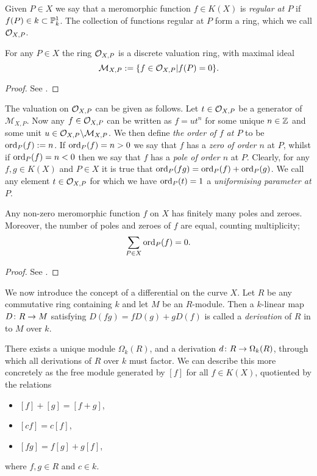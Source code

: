 Given $P \in X$ we say that a meromorphic function $f \in K(X)$ is \emph{regular at $P$} if $f(P) \in k \subset {\mathbb P}_k^1$.
The collection of functions regular at $P$ form a ring, which we call ${\cal O}_{X,P}$.

    \begin{lem}
    For any $P \in X$ the ring ${\cal O}_{X,P}$ is a discrete valuation ring, with maximal ideal
        \[
        \mathcal {M}_{X,P} := \{ f \in {\cal O}_{X,P} | f(P) = 0 \}.
        \]
    \end{lem}
    \begin{proof}
    See \cite[Chap.\ 1, \S 4]{fulton}.
    \end{proof}

The valuation on ${\cal O}_{X,P}$ can be given as follows.
Let $t \in {\cal O}_{X,P}$ be a generator of $\mathcal{M}_{X,P}$.
Now any $f \in {\cal O}_{X,P}$ can be written as $f = ut^n$ for some unique $n \in {\mathbb Z}$ and some unit $u \in {\cal O}_{X,P}\backslash \mathcal{M}_{X,P}$.
We then define \emph{the order of $f$ at $P$} to be $\operatorname{ord}_P(f) := n$.
If $\operatorname{ord}_P(f) = n >0$ we say that $f$ has a \emph{zero of order $n$} at $P$, whilst if $\operatorname{ord}_P(f) = n < 0$ then we say that $f$ has a \emph{pole of order $n$} at $P$.
Clearly, for any $f, g \in K(X)$ and $P \in X$ it is true that $\operatorname{ord}_P(fg) = \operatorname{ord}_P(f) + \operatorname{ord}_P(g)$.
We call any element $t \in {\cal O}_{X,P}$ for which we have $\operatorname{ord}_P(t)=1$ a \emph{uniformising parameter at $P$}.

    \begin{prop}\label{propfinitelymanyzeroesandpoles}
    Any non-zero meromorphic function $f$ on $X$ has finitely many poles and zeroes.
    Moreover, the number of poles and zeroes of $f$ are equal, counting multiplicity; \ie 
        \[
        \sum_{P \in X} \operatorname{ord}_P(f) = 0.
        \]
    \end{prop}
    \begin{proof}
    See \cite[Chap.\ 8, \S 1, Prop.\ 1]{fulton}.
    \end{proof}


We now introduce the concept of a differential on the curve $X$.
Let $R$ be any commutative ring containing $k$ and let $M$ be an $R$-module.
Then a $k$-linear map $D \colon R \rightarrow M$ satisfying $D(fg) = fD(g) + gD(f)$ is called a \emph{derivation} of $R$ in to $M$ over $k$.

There exists a unique module $\Omega_k(R)$, and a derivation $d \colon R \rightarrow \Omega_k(R)$, through which all derivations of $R$ over $k$ must factor.
We can describe this more concretely as the free module generated by $[f]$ for all $f \in K(X)$, quotiented by the relations
    \begin{itemize}
    \item $[f]+[g] = [f+g]$,
    \item $[cf] = c[f]$,
    \item $[fg] = f[g] + g[f]$,
    \end{itemize}
where $f, g \in R$ and $c \in k$.

